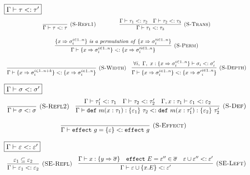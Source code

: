 \documentclass{article}
\theoremstyle{definition}
\newcommand{\keywadj}[1]{\mathtt{#1}}
\newcommand{\keyw}[1]{\keywadj{#1}~}
\begin{document}
\begin{figure}[H]
\footnotesize{


$\fbox{$\Gamma \vdash \tau <: \tau'$}$
\[
\begin{array}{c}
\infer[\textsc{(S-Refl1)}]
  {\Gamma \vdash \tau <:\tau}
  {}%
~~~~~~~~~~\hspace{10pt}
\infer[\textsc{(S-Trans)}]
  {\Gamma \vdash \tau_1 <: \tau_3}
  {\Gamma \vdash \tau_1 <: \tau_2 & \Gamma \vdash \tau_2 <: \tau_3}\\[3ex]

\infer[\textsc{(S-Perm)}]
  {\Gamma \vdash \{ x \Rightarrow \sigma_i^{i \in 1..n} \} <: \{ x \Rightarrow \sigma_i'^{i \in 1..n} \}}
  {\{ x \Rightarrow \sigma_i^{i \in 1..n} \}~\mathit{is~a~permutation~of}~\{ x \Rightarrow \sigma_i'^{i \in 1..n} \}}\\[3ex]
\infer[\textsc{(S-Width)}]
  {\Gamma \vdash \{ x \Rightarrow \sigma_i^{i \in 1..n + k} \} <: \{ x \Rightarrow \sigma_i^{i \in 1..n} \}}
  {} \quad 
\infer[\textsc{(S-Depth)}]
  {\Gamma \vdash \{ x \Rightarrow \sigma_i^{i \in 1..n} \} <: \{ x \Rightarrow {\sigma'}_i^{i \in 1..n} \}}
  {\forall i,~\Gamma,~x : \{ x \Rightarrow {\sigma}_i^{i \in 1..n} \} \vdash \sigma_i <: \sigma_i'}

\end{array}
\]


\noindent$\fbox{$\Gamma \vdash \sigma <: \sigma'$}$
\[
\begin{array}{c}
\infer[\textsc{(S-Refl2)}]
  {\Gamma \vdash \sigma <: \sigma}
  {} \quad
\infer[\textsc{(S-Def)}]
  {\Gamma \vdash \keyw{def} m(x : \tau_1) : \{ \varepsilon_1 \}~\tau_2 <: \keyw{def} m(x : \tau_1') : \{ \varepsilon_2 \}~\tau_2'}
  {\Gamma \vdash \tau_1' <: \tau_1 & \Gamma \vdash \tau_2 <: \tau_2' & \Gamma, x : \tau_1 \vdash \varepsilon_1 <: \varepsilon_2 }\\[3ex]

\infer[\textsc{(S-Effect)}]
  {\Gamma \vdash \keyw{effect} g = \{ \varepsilon \} <: \keyw{effect} g}
  {}\quad
  
  
  
\end{array}
\]


\noindent$\fbox{$\Gamma \vdash \varepsilon <: \varepsilon'$}$
\[
\begin{array}{c}
\infer[\textsc{(SE-Refl)}]
  {\Gamma \vdash \varepsilon_1 <: \varepsilon_2}
  {\varepsilon_1  \subseteq \varepsilon_2} \quad
\infer[\textsc{(SE-Left)}]
  {\Gamma \vdash \varepsilon \cup \{x.E\} <: \varepsilon' }
  {\Gamma \vdash x : \{y \Rightarrow \overline{\sigma}\} & \keyw{effect} E = \varepsilon'' \in \overline{\sigma} & \varepsilon \cup  \varepsilon'' <: \varepsilon'  } \\[3ex]
  

\end{array}\]}
\end{figure}
\end{document}
